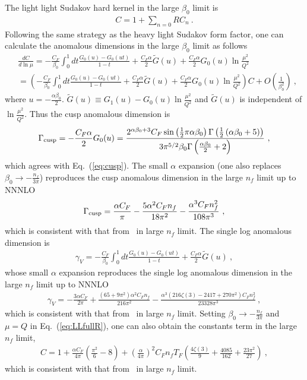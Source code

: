 \documentclass[a4paper,11pt]{article}
\begin{document}
The light light Sudakov hard kernel in the large $\beta_0$ limit is
\begin{align}
    C= 1 + \sum_{n=0}RC_n \ .
\end{align}
Following the same strategy as the heavy light Sudakov form factor, one can calculate the anomalous dimensions in the large $\beta_0$ limit as follows
\begin{align}
    &\frac{d C}{d \ln \mu} = -\frac{C_F}{\beta_0} \int_{0}^{1} d t \frac{G_{0}(u) - G_{0}(u t)}{1-t} + \frac{C_F \alpha}{2} \tilde{G}(u) + \frac{C_F \alpha}{2} G_{0}(u) \ln \frac{\mu^2}{Q^2} \nonumber\\
    &= \left(-\frac{C_F}{\beta_0} \int_{0}^{1} d t \frac{G_{0}(u) - G_{0}(u t)}{1-t} + \frac{C_F \alpha}{2} \tilde{G}(u) + \frac{C_F \alpha}{2} G_{0}(u) \ln \frac{\mu^2}{Q^2}\right) C + O\left(\frac{1}{\beta_0^2}\right) \ ,
\end{align}
where $u = - \frac{\alpha \beta_0}{2}$. $\tilde G(u) \equiv G_{1}(u) - G_{0}(u) \ln \frac{\mu^2}{Q^2}$ and $\tilde G(u)$ is independent of $\ln \frac{\mu^2}{Q^2}$. Thus the cusp anomalous dimension is
\begin{align}
    \Gamma_{\rm cusp} = - \frac{C_F \alpha}{2} G_{0}(u) = \frac{2^{\alpha  \beta _0+3} C_F \sin \left(\frac{1}{2} \pi  \alpha  \beta _0\right) \Gamma \left(\frac{1}{2}
   \left(\alpha  \beta _0+5\right)\right)}{3 \pi ^{5/2} \beta _0 \Gamma \left(\frac{\alpha  \beta _0}{2}+2\right)} \ ,
\end{align}
which agrees with Eq.~(\ref{eq:cusp}). The small $\alpha$ expansion (one also replaces $\beta_0 \rightarrow -\frac{n_f}{3\pi}$) reproduces the cusp anomalous dimension in the large $n_f$ limit up to NNNLO
\begin{align}
\Gamma_{\rm cusp} = \frac{\alpha  C_F}{\pi } -\frac{5 \alpha ^2 C_F n_f}{18 \pi ^2} - \frac{\alpha ^3 C_F n_f^2}{108 \pi ^3}  \ ,
\end{align}
which is consistent with that from~\cite{Becher:2006mr} in large $n_f$ limit. The single log anomalous dimension is
\begin{align}
    \gamma_V = -\frac{C_F}{\beta_0} \int_{0}^{1} d t \frac{G_{0}(u) - G_{0}(u t)}{1-t} + \frac{C_F \alpha}{2} \tilde{G}(u) \ ,
\end{align}
whose small $\alpha$ expansion reproduces the single log anomalous dimension in the large $n_f$ limit up to NNNLO
\begin{align}
\gamma_V = -\frac{3 \alpha  C_F}{2 \pi } + \frac{\left(65+9 \pi ^2\right) \alpha ^2 C_F n_f}{216 \pi ^2}-\frac{\alpha ^3 \left(216 \zeta (3)-2417+270 \pi^2\right) C_F n_f^2}{23328 \pi ^3} \ ,
\end{align}
which is consistent with that from~\cite{Becher:2006mr} in large $n_f$ limit. Setting $\beta_0 \rightarrow -\frac{n_f}{3\pi}$ and $\mu=Q$ in Eq.~(\ref{eq:LLfullR}), one can also obtain the constants term in the large $n_f$ limit,
\begin{align}
C = 1 +\frac{\alpha  C_F}{4 \pi } \left(\frac{\pi ^2}{6}-8\right) + \left(\frac{\alpha}{4\pi}\right)^2 C_F n_f T_F \left(\frac{4 \zeta (3)}{9}+\frac{4085}{162}+\frac{23 \pi ^2}{27}\right) \ ,
\end{align}
which is consistent with that from~\cite{Becher:2006mr} in large $n_f$ limit.
\end{document}
